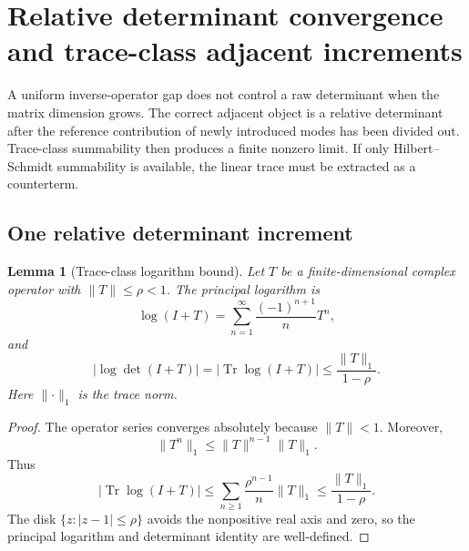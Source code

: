 \documentclass[11pt]{article}
\newtheorem{lemma}[theorem]{Lemma}
\begin{document}

\section{Relative determinant convergence and trace-class adjacent
increments}
\label{sec:v11v58}

A uniform inverse-operator gap does not control a raw determinant when
the matrix dimension grows.  The correct adjacent object is a relative
determinant after the reference contribution of newly introduced modes
has been divided out.  Trace-class summability then produces a finite
nonzero limit.  If only Hilbert--Schmidt summability is available, the
linear trace must be extracted as a counterterm.

\subsection{One relative determinant increment}

\begin{lemma}[Trace-class logarithm bound]
\label{lem:v11v58-log}
Let \(T\) be a finite-dimensional complex operator with
\(\lVert T\rVert\le\rho<1\).  The principal logarithm is
\[
                       \log(I+T)
                 =\sum_{n=1}^{\infty}\frac{(-1)^{n+1}}nT^n,   \tag{58.1}
\]
and
\[
 \left|\log\det(I+T)\right|
 =\left|\operatorname{Tr}\log(I+T)\right|
 \le\frac{\lVert T\rVert_1}{1-\rho}.                          \tag{58.2}
\]
Here \(\lVert\cdot\rVert_1\) is the trace norm.
\end{lemma}

\begin{proof}
The operator series converges absolutely because \(\lVert T\rVert<1\).
Moreover,
\[
 \lVert T^n\rVert_1
 \le\lVert T\rVert^{n-1}\lVert T\rVert_1.
\]
Thus
\[
 |\operatorname{Tr}\log(I+T)|
 \le\sum_{n\ge1}\frac{\rho^{n-1}}n\lVert T\rVert_1
 \le\frac{\lVert T\rVert_1}{1-\rho}.
\]
The disk \(\{z:|z-1|\le\rho\}\) avoids the nonpositive real axis and
zero, so the principal logarithm and determinant identity are
well-defined.
\end{proof}
\end{document}
